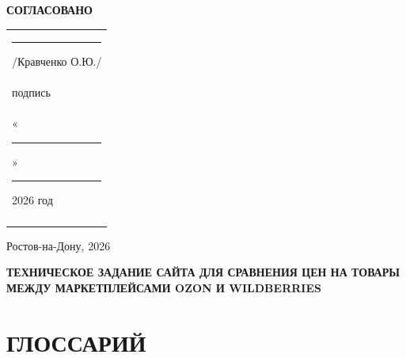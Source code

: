 \documentclass[a4paper,12pt]{article}
\begin{document}
\begin{titlepage}
\noindent
\hspace{2.5cm} \textbf{СОГЛАСОВАНО}

\vspace{1.5cm}

\noindent
\begin{tabular}{@{}p{}@{}}
	\rule{6cm}{0.4pt} /Кравченко О.Ю./ \\
	\hspace{2.4cm} \small подпись \\[2cm]
	«\rule{1.5cm}{0.4pt}» \rule{5cm}{0.4pt} 2026 год \\
	\centering{\small дата} \\
\end{tabular}

    \vfill
    \begin{center}
        Ростов-на-Дону, 2026
    \end{center}
\end{titlepage}

\newpage
\tableofcontents
\newpage


\textbf{ТЕХНИЧЕСКОЕ ЗАДАНИЕ САЙТА ДЛЯ СРАВНЕНИЯ ЦЕН НА ТОВАРЫ МЕЖДУ МАРКЕТПЛЕЙСАМИ OZON И WILDBERRIES}


\section{ГЛОССАРИЙ}
\end{document}
